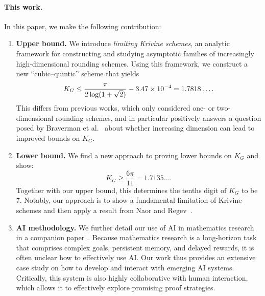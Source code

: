 \paragraph{This work.}
In this paper, we make the following contribution:
\begin{enumerate}
    \item \textbf{Upper bound.} We introduce \emph{limiting Krivine schemes}, an analytic framework for constructing and studying asymptotic families of increasingly high-dimensional rounding schemes. Using this framework, we construct a new ``cubic--quintic'' scheme that yields
    \[
        K_G
        \le {\pi\over 2\log(1+\sqrt2)} - 3.47 \times 10^{-4}
        = 1.7818 \ldots.
    \]
    This differs from previous works, which only considered one- or two-dimensional rounding schemes, and in particular positively answers a question posed by Braverman et al.~\cite{braverman2011grothendieckconstantstrictlysmaller} about whether increasing dimension can lead to improved bounds on $K_G$.

    \item \textbf{Lower bound.} We find a new approach to proving lower bounds on $K_G$ and show:
    \[
        K_G \ge \frac{6\pi}{11}=1.7135\ldots.
    \]
    Together with our upper bound, this determines the tenths digit of \(K_G\) to be 7.
    Notably, our approach is to show a fundamental limitation of Krivine schemes and then apply a result from Naor and Regev~\cite{naor2014krivine}.
    

    \item \textbf{AI methodology.}
    We further detail our use of AI in mathematics research in a companion paper~\cite{lisaha2026longhorizon}.
    Because mathematics research is a long-horizon task that comprises complex goals, persistent memory, and delayed rewards, it is often unclear how to effectively use AI.
    Our work thus provides an extensive case study on how to develop and interact with emerging AI systems.    
    Critically, this system is also highly collaborative with human interaction, which allows it to effectively explore promising proof strategies.

\end{enumerate}




